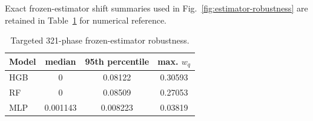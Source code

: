 \documentclass[10pt,twocolumn]{article}
\newcommand{\wq}{w_q}
\begin{document}
Exact frozen-estimator shift summaries used in
Fig.~\ref{fig:estimator-robustness} are retained in
Table~\ref{tab:robustness} for numerical reference.

\begin{table}[t]
\caption{Targeted 321-phase frozen-estimator robustness.}
\label{tab:robustness}
\centering
\begin{tabular}{lccc}
Model & median & 95th percentile & max. $\wq$ \\
\hline
HGB & 0 & 0.08122 & 0.30593 \\
RF & 0 & 0.08509 & 0.27053 \\
MLP & 0.001143 & 0.008223 & 0.03819 \\
\end{tabular}
\end{table}

\FloatBarrier


\end{document}
